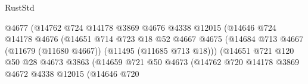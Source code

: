 \begin{lexlean}{RustStd}
\begin{coremodule}
                                              @4677
                                              (@14762
                                                @724
                                                @14178
                                                @3869
                                                @4676
                                                @4338
                                                @12015
                                                (@14646
                                                  @724
                                                  @14178
                                                  @4676
                                                  (@14651
                                                    @714
                                                    @723
                                                    @18
                                                    @52
                                                    @4667
                                                    @4675
                                                    (@14684
                                                      @713
                                                      @4667
                                                      (@11679 (@11680 @4667))
                                                      (@11495 (@11685 @713 @18)))
                                                    (@14651
                                                      @721
                                                      @120
                                                      @50
                                                      @28
                                                      @4673
                                                      @3863
                                                      (@14659
                                                        @721
                                                        @50
                                                        @4673
                                                        (@14762
                                                          @720
                                                          @14178
                                                          @3869
                                                          @4672
                                                          @4338
                                                          @12015
                                                          (@14646
                                                            @720

\end{coremodule}
\end{lexlean}
